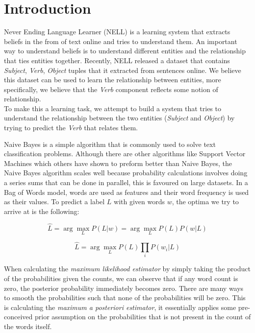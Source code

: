 \section{Introduction}

Never Ending Language Learner (NELL) is a learning system that extracts beliefs in the from of text online and tries to understand them. An important way to understand beliefs is to understand different entities and the relationship that ties entities together. Recently, NELL released a dataset that contains \emph{Subject}, \emph{Verb}, \emph{Object} tuples that it extracted from sentences online. We believe this dataset can be used to learn the relationship between entities, more specifically, we believe that the \emph{Verb} component reflects some notion of relationship.\\

To make this a learning task, we attempt to build a system that tries to understand the relationship between the two entities (\emph{Subject} and \emph{Object}) by trying to predict the \emph{Verb} that relates them.


Naive Bayes is a simple algorithm that is commonly used to solve text classification problems. Although there are other algorithms like Support Vector Machines which others have shown to preform better than Naive Bayes, the Naive Bayes algorithm scales well because probability calculations involves doing a series sums that can be done in parallel, this is favoured on large datasets. In a Bag of Words model, words are used as features and their word frequency is used as their values. To predict a label $L$ with given words $w$, the optima we try to arrive at is the following:

\begin{equation}
	\hat{L} = \arg\max_L P(L|w) = \arg\max_L P(L)P(w|L)
\end{equation}

\begin{equation}
	\hat{L} = \arg\max_L P(L) \prod_i{P(w_i|L)}
\end{equation}

When calculating the \emph{maximum likelihood estimator} by simply taking the product of the probabilities given the counts, we can observe that if any word count is zero, the posterior probability immediately becomes zero. There are many ways to smooth the probabilities such that none of the probabilities will be zero. This is calculating the \emph{maximum a posteriori estimator}, it essentially applies some pre-conceived prior assumption on the probabilities that is not present in the count of the words itself.